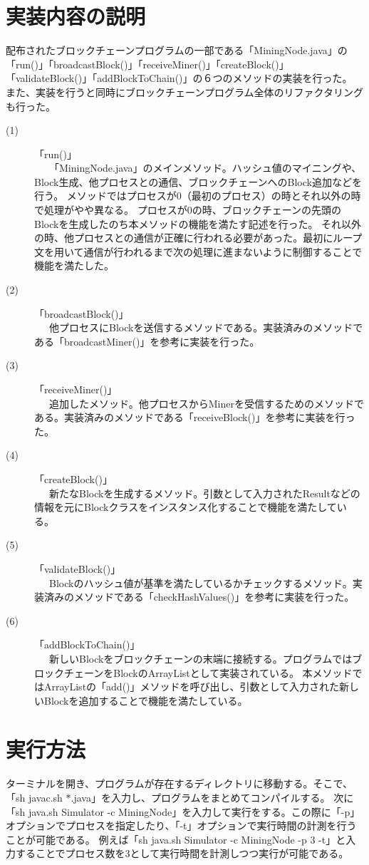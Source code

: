 \documentclass[uplatex, twocolumn, dvipdfmx, 10pt]{jsarticle}
\begin{document}
\section{実装内容の説明}
配布されたブロックチェーンプログラムの一部である「MiningNode.java」の「run()」「broadcastBlock()」「receiveMiner()」「createBlock()」「validateBlock()」「addBlockToChain()」の６つのメソッドの実装を行った。
また、実装を行うと同時にブロックチェーンプログラム全体のリファクタリングも行った。
\begin{description}
  \item[(1)]「run()」
  \\\ \ \ 「MiningNode.java」のメインメソッド。ハッシュ値のマイニングや、Block生成、他プロセスとの通信、ブロックチェーンへのBlock追加などを行う。
  メソッドではプロセスが0（最初のプロセス）の時とそれ以外の時で処理がやや異なる。
  プロセスが0の時、ブロックチェーンの先頭のBlockを生成したのち本メソッドの機能を満たす記述を行った。
  それ以外の時、他プロセスとの通信が正確に行われる必要があった。最初にループ文を用いて通信が行われるまで次の処理に進まないように制御することで機能を満たした。
  \item[(2)]「broadcastBlock()」
  \\\ \ \ 他プロセスにBlockを送信するメソッドである。実装済みのメソッドである「broadcastMiner()」を参考に実装を行った。
  \item[(3)]「receiveMiner()」
  \\\ \ \ 追加したメソッド。他プロセスからMinerを受信するためのメソッドである。実装済みのメソッドである「receiveBlock()」を参考に実装を行った。
  \item[(4)]「createBlock()」
  \\\ \ \ 新たなBlockを生成するメソッド。引数として入力されたResultなどの情報を元にBlockクラスをインスタンス化することで機能を満たしている。
  \item[(5)]「validateBlock()」
  \\\ \ \ Blockのハッシュ値が基準を満たしているかチェックするメソッド。実装済みのメソッドである「checkHashValues()」を参考に実装を行った。
  \item[(6)]「addBlockToChain()」
  \\\ \ \ 新しいBlockをブロックチェーンの末端に接続する。プログラムではブロックチェーンをBlockのArrayListとして実装されている。
  本メソッドではArrayListの「add()」メソッドを呼び出し、引数として入力された新しいBlockを追加することで機能を満たしている。
\end{description}

\section{実行方法}
ターミナルを開き、プログラムが存在するディレクトリに移動する。そこで、「sh javac.sh *.java」を入力し、プログラムをまとめてコンパイルする。
次に「sh java.sh Simulator -c MiningNode」を入力して実行をする。この際に「-p」オプションでプロセスを指定したり、「-t」オプションで実行時間の計測を行うことが可能である。
例えば「sh java.sh Simulator -c MiningNode -p 3 -t」と入力することでプロセス数を3として実行時間を計測しつつ実行が可能である。
\end{document}
